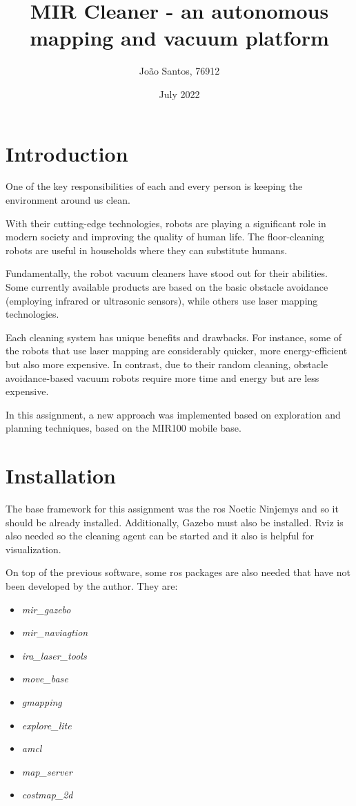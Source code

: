\documentclass[]{article}
\title{MIR Cleaner - an autonomous mapping and vacuum platform}
\author[1]{João Santos, 76912}
\affil[1]{Department of Electronics, Telecommunications and Informatics, University of Aveiro}
\date{July 2022}
\begin{document}
\maketitle

\section{Introduction}

One of the key responsibilities of each and every person is keeping the environment around us clean.

With their cutting-edge technologies, robots are playing a significant role in modern society and improving the quality of human life. The floor-cleaning robots are useful in households where they can substitute humans.

Fundamentally, the robot vacuum cleaners have stood out for their abilities. Some currently available products are based on the basic obstacle avoidance (employing infrared or ultrasonic sensors), while others use laser mapping technologies.

Each cleaning system has unique benefits and drawbacks. For instance, some of the robots that use laser mapping are considerably quicker, more energy-efficient but also more expensive. In contrast, due to their random cleaning, obstacle avoidance-based vacuum robots require more time and energy but are less expensive.

In this assignment, a new approach was implemented based on exploration and planning techniques, based on the MIR100 mobile base.

\section{Installation}

The base framework for this assignment was the \gls{ros} Noetic Ninjemys and so it should be already installed. Additionally, Gazebo must also be installed. Rviz is also needed so the cleaning agent can be started and it also is helpful for visualization.

On top of the previous software, some \gls{ros} packages are also needed that have not been developed by the author. They are:
%
\begin{itemize}
    \item \textit{mir\_gazebo}
    \item \textit{mir\_naviagtion}
    \item \textit{ira\_laser\_tools}
    \item \textit{move\_base}
    \item \textit{gmapping}
    \item \textit{explore\_lite}
    \item \textit{amcl}
    \item \textit{map\_server}
    \item \textit{costmap\_2d}
\end{itemize}
\end{document}
